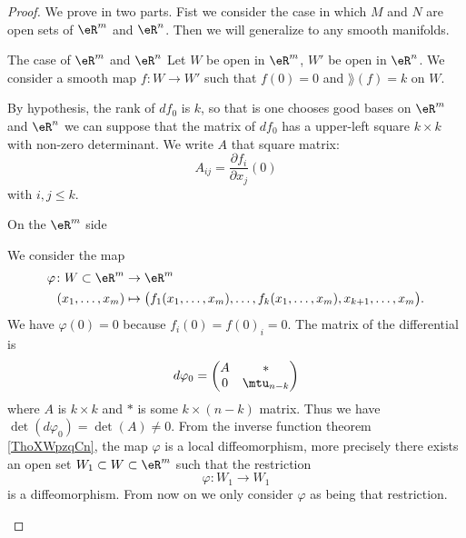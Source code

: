 \begin{proof}
    We prove in two parts. Fist we consider the case in which \( M\) and \( N\) are open sets of \( \eR^m\) and \( \eR^n\). Then we will generalize to any smooth manifolds.
    \begin{subproof}
        \item[The case of \( \eR^m\) and \( \eR^n\)]
            Let \( W\) be open in \( \eR^m\), \( W'\) be open in \( \eR^n\). We consider a smooth map \( f\colon W\to W'\) such that \( f(0)=0\) and \( \rang(f)=k\) on \( W\).

            By hypothesis, the rank of \( df_0\) is \( k\), so that is one chooses good bases on \( \eR^m\) and \( \eR^n\) we can suppose that the matrix of \( df_0\) has a upper-left square \( k\times k\) with non-zero determinant. We write \( A\) that square matrix:
            \begin{equation}
                A_{ij}=\frac{ \partial f_i }{ \partial x_j }(0)
            \end{equation}
            with \( i,j\leq k\).

            \begin{subproof}
                \item[On the \( \eR^m\) side]

                    We consider the map
                    \begin{equation}
                        \begin{aligned}
                            \varphi\colon W\subset \eR^m&\to \eR^m \\
                            (x_1,\ldots, x_m)&\mapsto \big( f_1(x_1,\ldots, x_m),\ldots, f_k(x_1,\ldots, x_m),x_{k+1},\ldots, x_m \big). 
                        \end{aligned}
                    \end{equation}
                    We have \( \varphi(0)=0\) because \( f_i(0)=f(0)_i=0\). The matrix of the differential is
                    \begin{equation}
                        d\varphi_0=\begin{pmatrix}
                            A    &   *    \\ 
                            0    &   \mtu_{n-k}    
                        \end{pmatrix}
                    \end{equation}
                    where \( A\) is \( k\times k\) and \( *\) is some \( k\times (n-k)\) matrix. Thus we have \( \det(d\varphi_0)=\det(A)\neq 0\). From the inverse function theorem \ref{ThoXWpzqCn}, the map \( \varphi\) is a local diffeomorphism, more precisely there exists an open set \( W_1\subset W\subset \eR^m\) such that the restriction
                    \begin{equation}
                        \varphi\colon W_1\to W_1
                    \end{equation}
                    is a diffeomorphism. From now on we only consider \( \varphi\) as being that restriction.


\end{subproof}
\end{subproof}
\end{proof}
